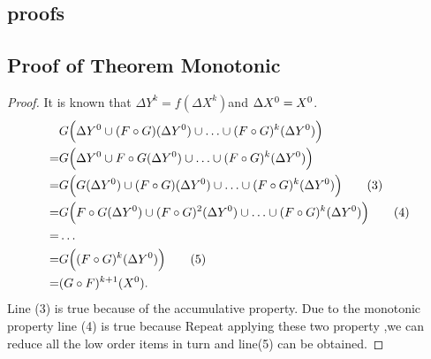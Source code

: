 \begin{appendix}
\section{proofs}
\subsection{Proof of Theorem Monotonic}

\begin{proof}
	\label{sec:app:proof:monotonic}
	It is known that $\Delta Y^k=f(\Delta X^k)$and $\Delta X^0=X^0\\$.
	\begin{align}
	&G\Big(\Delta Y^0\cup (F\circ G)(\Delta Y^0)\cup\ldots\cup (F\circ G)^k(\Delta Y^0)\Big)\notag \\
	=&G\Big(\Delta Y^0\cup F\circ G(\Delta Y^0)\cup \ldots \cup (F\circ G)^k(\Delta Y^0)\Big)    \notag\\
	=&G\Big(G(\Delta Y^0)\cup (F\circ G)(\Delta Y^0)\cup \ldots \cup (F\circ G)^k( \Delta Y^0)\Big)\tag{3}\\
	=&G\Big(F\circ G(\Delta Y^0)\cup (F\circ G)^2(\Delta Y^0)\cup \ldots \cup (F\circ G)^k(\Delta Y^0)\Big) \tag{4}\\
	=& \ldots \notag \\
	=&G\Big((F\circ G)^k(\Delta Y^0)\Big)\tag{5}\\
	=&(G \circ F)^{k+1}(X^0).\notag
	\end{align}
	Line (3) is true because of the accumulative property. Due to the monotonic property line (4) is true because  Repeat applying these two property ,we can reduce all the low order items in turn and line(5) can be obtained. 
\end{proof}


\end{appendix}
